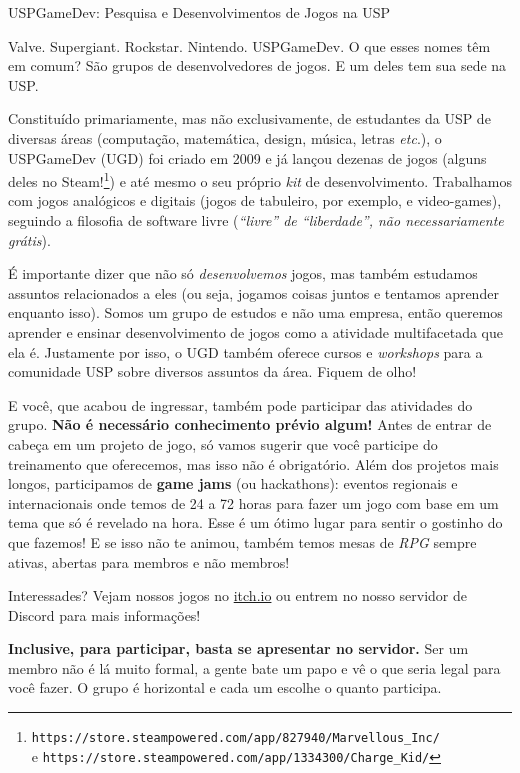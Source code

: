 \begin{subsecao}{USPGameDev: Pesquisa e Desenvolvimentos de Jogos na USP}


Valve. Supergiant. Rockstar. Nintendo. USPGameDev. O que esses nomes têm em
comum? São grupos de desenvolvedores de jogos. E um deles tem sua sede na USP.

Constituído primariamente, mas não exclusivamente, de estudantes da USP de
diversas áreas (computação, matemática, design, música, letras \textit{etc}.),
o USPGameDev (UGD) foi criado em 2009 e já lançou dezenas de jogos (alguns
deles no Steam!\footnote{\texttt{https://store.steampowered.com/app/827940/Marvellous\_Inc/}
\\ e \texttt{https://store.steampowered.com/app/1334300/Charge\_Kid/}}) e até
mesmo o seu próprio \textit{kit} de desenvolvimento. Trabalhamos com jogos
analógicos e digitais (jogos de tabuleiro, por exemplo, e video-games),
seguindo a filosofia de software livre (\textit{``livre'' de ``liberdade'',
não necessariamente grátis}).

É importante dizer que não só \textit{desenvolvemos} jogos, mas também
estudamos assuntos relacionados a eles (ou seja, jogamos coisas juntos e
tentamos aprender enquanto isso). Somos um grupo de estudos e não uma empresa,
então queremos aprender e ensinar desenvolvimento de jogos como a atividade
multifacetada que ela é. Justamente por isso, o UGD também oferece cursos e
\textit{workshops} para a comunidade USP sobre diversos assuntos da área.
Fiquem de olho!

E você, que acabou de ingressar, também pode participar das atividades do grupo.
\textbf{Não é necessário conhecimento prévio algum!} Antes de entrar de cabeça
em um projeto de jogo, só vamos sugerir que você participe do treinamento que
oferecemos, mas isso não é obrigatório. Além dos projetos mais longos,
participamos de \textbf{game jams} (ou hackathons): eventos regionais e
internacionais onde temos de 24 a 72 horas para fazer um jogo com base em um
tema que só é revelado na hora. Esse é um ótimo lugar para sentir o gostinho
do que fazemos! E se isso não te animou, também temos mesas de \textit{RPG}
sempre ativas, abertas para membros e não membros!

Interessades? Vejam nossos jogos no \url{itch.io} ou entrem no nosso servidor
de Discord para mais informações!

\textbf{Inclusive, para participar, basta se apresentar no servidor.} 
Ser um membro não é lá muito formal, a gente bate um papo e vê 
o que seria legal para você fazer. O grupo é horizontal e cada 
um escolhe o quanto participa.


\end{subsecao}
